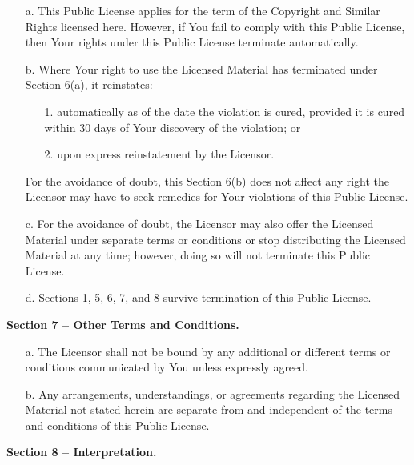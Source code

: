 \begin{itemize}
    \item[a.] This Public License applies for the term of the Copyright and Similar Rights licensed here. However, if You fail to comply with this Public License, then Your rights under this Public License terminate automatically.
    \item[b.] Where Your right to use the Licensed Material has terminated under Section 6(a), it reinstates:
    \begin{itemize}
        \item[1.] automatically as of the date the violation is cured, provided it is cured within 30 days of Your discovery of the violation; or
        \item[2.] upon express reinstatement by the Licensor.
    \end{itemize}

     For the avoidance of doubt, this Section 6(b) does not affect any right the Licensor may have to seek remedies for Your violations of this Public License.

    \item[c.] For the avoidance of doubt, the Licensor may also offer the Licensed Material under separate terms or conditions or stop distributing the Licensed Material at any time; however, doing so will not terminate this Public License.
    \item[d.] Sections 1, 5, 6, 7, and 8 survive termination of this Public License.
\end{itemize}

\begin{center}
    \textbf{Section 7 -- Other Terms and Conditions.}
\end{center}

\begin{itemize}
    \item[a.] The Licensor shall not be bound by any additional or different terms or conditions communicated by You unless expressly agreed.
    \item[b.] Any arrangements, understandings, or agreements regarding the Licensed Material not stated herein are separate from and independent of the terms and conditions of this Public License.
\end{itemize}

\begin{center}
    \textbf{Section 8 -- Interpretation.}
\end{center}

